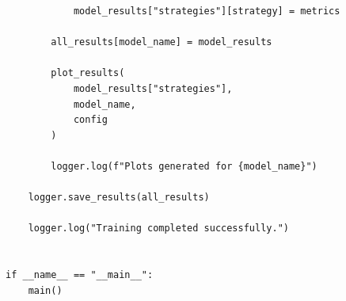 \begin{verbatim}
            model_results["strategies"][strategy] = metrics

        all_results[model_name] = model_results

        plot_results(
            model_results["strategies"],
            model_name,
            config
        )

        logger.log(f"Plots generated for {model_name}")

    logger.save_results(all_results)

    logger.log("Training completed successfully.")


if __name__ == "__main__":
    main()

\end{verbatim}
